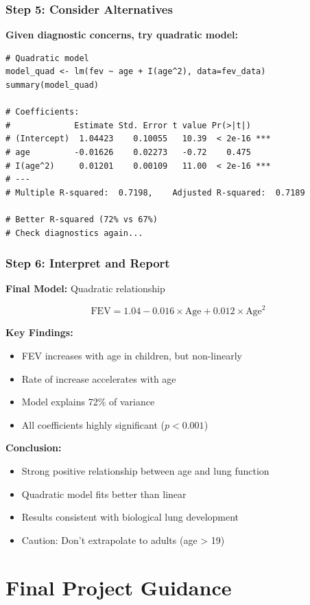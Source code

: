 \documentclass{beamer}
\begin{document}
\begin{frame}[fragile]
\frametitle{Step 5: Consider Alternatives}
\textbf{Given diagnostic concerns, try quadratic model:}

\small
\begin{verbatim}
# Quadratic model
model_quad <- lm(fev ~ age + I(age^2), data=fev_data)
summary(model_quad)

# Coefficients:
#             Estimate Std. Error t value Pr(>|t|)
# (Intercept)  1.04423    0.10055   10.39  < 2e-16 ***
# age         -0.01626    0.02273   -0.72    0.475
# I(age^2)     0.01201    0.00109   11.00  < 2e-16 ***
# ---
# Multiple R-squared:  0.7198,    Adjusted R-squared:  0.7189

# Better R-squared (72% vs 67%)
# Check diagnostics again...
\end{verbatim}
\end{frame}

\begin{frame}
\frametitle{Step 6: Interpret and Report}
\textbf{Final Model:} Quadratic relationship

$$\text{FEV} = 1.04 - 0.016 \times \text{Age} + 0.012 \times \text{Age}^2$$

\vspace{0.3cm}
\textbf{Key Findings:}
\begin{itemize}
\item FEV increases with age in children, but non-linearly
\item Rate of increase accelerates with age
\item Model explains 72\% of variance
\item All coefficients highly significant ($p < 0.001$)
\end{itemize}

\vspace{0.3cm}
\textbf{Conclusion:}
\begin{itemize}
\item Strong positive relationship between age and lung function
\item Quadratic model fits better than linear
\item Results consistent with biological lung development
\item Caution: Don't extrapolate to adults (age > 19)
\end{itemize}
\end{frame}

\section{Final Project Guidance}
\end{document}
